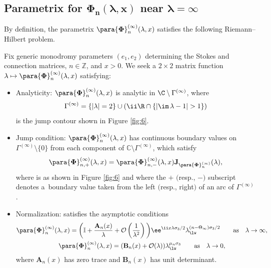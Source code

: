 \subsection[Parametrix for Phi\_n(lambda,x) near lambda=infty]{Parametrix for $\boldsymbol{{\Phi}_n(\lambda,x)}$ near $\boldsymbol{\lambda=\infty}$}
\label{sec:Parametrix-infinity}
By definition, the parametrix
$\para{\boldsymbol \Phi}_n^{(\infty)}(\lambda,x)$
satisfies the following Riemann--Hilbert problem.
\begin{rhp} \label{rhp:infinity_parametrix}
Fix generic monodromy parameters $( e_1, e_2 )$ determining the Stokes and connection matrices, $n\in\mathbb{Z}$, and $x>0$. We seek a $2 \times 2$ matrix function $\lambda\mapsto\para{\boldsymbol \Phi}_n^{(\infty)}(\lambda,x)$ satisfying:
\begin{itemize}\itemsep=0pt
\item Analyticity: $\para{\boldsymbol \Phi}_n^{(\infty)}(\lambda,x)$ is analytic in $\C \setminus \Gamma^{(\infty)}$, where
\[\Gamma^{(\infty)} = \{ | \lambda| = 2\} \cup (\ii \R\cap \{ |{\im}\,\lambda-1| > 1\})\]
 is the jump contour shown in Figure {\rm\ref{fig:6}}.
\item  Jump condition: $\para{\boldsymbol \Phi}_n^{(\infty)}(\lambda,x)$ has continuous boundary values on $\Gamma^{(\infty)} \setminus \{0\}$ from each component of $\mathbb{C}\setminus \Gamma^{(\infty)}$, which satisfy
\[
\para{\boldsymbol \Phi}_{n,+}^{(\infty)}(\lambda,x) = \para{\boldsymbol \Phi}_{n,-}^{(\infty)}(\lambda,x)\mathbf J_{\para{\boldsymbol \Phi}_n^{(\infty)}}(\lambda),
\]
 where  is as shown in Figure {\rm\ref{fig:6}} and where the $+$ $($resp., $-)$ subscript denotes a~boundary value taken from the left $($resp., right$)$ of an arc of $\Gamma^{(\infty)}$.
\item Normalization:  satisfies the asymptotic conditions{\samepage
\begin{gather}
\label{eq:Phi-asymptotic-infinity}
\para{\boldsymbol \Phi}_n^{(\infty)}(\lambda,x) = \bigg(\mathbb I + \dfrac{\mathbf{A}_{n}(x)}{\lambda} + \mathcal{O}\left( \dfrac{1}{\lambda^2}\right) \bigg) \ee^{\ii x \lambda \sigma_3/2} \lambda_{\lw}^{(n - \Theta_\infty )\sigma_3/2} \qquad \text{as} \quad \lambda \to \infty,
\\
\label{eq:Phi-asymptotic-zero}
\para{\boldsymbol \Phi}_n^{(\infty)}(\lambda,x) = ( \mathbf{B}_{n}(x) + \mathcal{O}(\lambda) ) \lambda_{\lw}^{\mu_n \sigma_3} \qquad \text{as} \quad \lambda \to 0,
\end{gather}
where $\mathbf{A}_n(x)$ has zero trace and $ \mathbf{B}_{n}(x)$ has unit determinant.}
\end{itemize}
\end{rhp}



